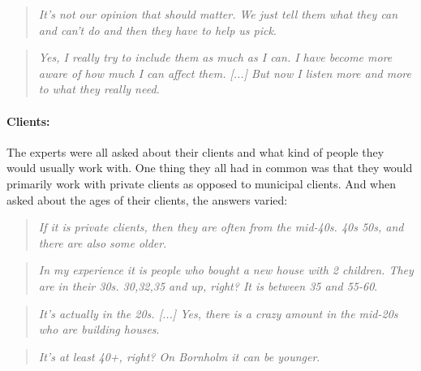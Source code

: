 		\begin{quote}
			\textit{It's not our opinion that should matter. We just tell them what they can and can't do and then they have to help us pick}\label{quote:expertProcess2}.\\
		\end{quote}
		
		\begin{quote}
			\textit{Yes, I really try to include them as much as I can. I have become more aware of how much I can affect them. [...] But now I listen more and more to what they really need. }\label{quote:expertProcess3}\\
		\end{quote}
		
		\paragraph*{Clients:}
		The experts were all asked about their clients and what kind of people they would usually work with. One thing they all had in common was that they would primarily work with private clients as opposed to municipal clients. And when asked about the ages of their clients, the answers varied:\\
		\begin{quote}
			\textit{If it is private clients, then they are often from the mid-40s. 40s 50s, and there are also some older}\label{quote:expertClients1}.\\
		\end{quote}
		
		\begin{quote}
			\textit{In my experience it is people who bought a new house with 2 children. They are in their 30s. 30,32,35 and up, right? It is between 35 and 55-60}\label{quote:expertClients2}.\\
		\end{quote}
		
		\begin{quote}
			\textit{It's actually in the 20s. [...] Yes, there is a crazy amount in the mid-20s who are building houses}\label{quote:expertClients3}.\\
		\end{quote}
		
		\begin{quote}
			\textit{It's at least 40+, right? On Bornholm it can be younger}\label{quote:expertClients4}.\\
		\end{quote}
		
